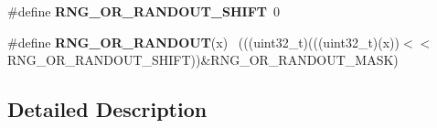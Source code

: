 \begin{DoxyCompactItemize}
\item 
\hypertarget{group___r_n_g___register___masks_ga3f7e8e180fafb10fbbe34e9dced30b87}{}\#define {\bfseries R\+N\+G\+\_\+\+O\+R\+\_\+\+R\+A\+N\+D\+O\+U\+T\+\_\+\+S\+H\+I\+F\+T}~0\label{group___r_n_g___register___masks_ga3f7e8e180fafb10fbbe34e9dced30b87}

\item 
\hypertarget{group___r_n_g___register___masks_gaaf59ccee7ac282bf06975d6c513bf256}{}\#define {\bfseries R\+N\+G\+\_\+\+O\+R\+\_\+\+R\+A\+N\+D\+O\+U\+T}(x)                                            ~(((uint32\+\_\+t)(((uint32\+\_\+t)(x))$<$$<$R\+N\+G\+\_\+\+O\+R\+\_\+\+R\+A\+N\+D\+O\+U\+T\+\_\+\+S\+H\+I\+F\+T))\&R\+N\+G\+\_\+\+O\+R\+\_\+\+R\+A\+N\+D\+O\+U\+T\+\_\+\+M\+A\+S\+K)\label{group___r_n_g___register___masks_gaaf59ccee7ac282bf06975d6c513bf256}

\end{DoxyCompactItemize}


\subsection{Detailed Description}
